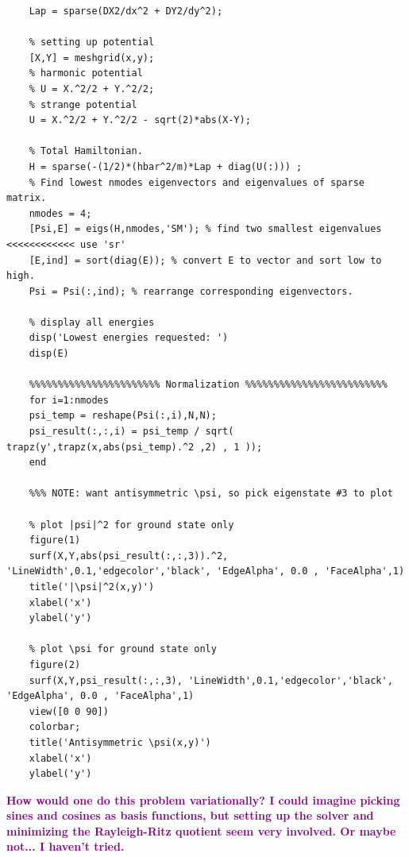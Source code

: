 \documentclass{article}
\theoremstyle{definition}
\begin{document}
\begin{enumerate}[label=(\alph*)]
\begin{lstlisting}
	Lap = sparse(DX2/dx^2 + DY2/dy^2);
	
	% setting up potential
	[X,Y] = meshgrid(x,y);
	% harmonic potential 
	% U = X.^2/2 + Y.^2/2;
	% strange potential
	U = X.^2/2 + Y.^2/2 - sqrt(2)*abs(X-Y);
	
	% Total Hamiltonian.
	H = sparse(-(1/2)*(hbar^2/m)*Lap + diag(U(:))) ; 
	% Find lowest nmodes eigenvectors and eigenvalues of sparse matrix.
	nmodes = 4; 
	[Psi,E] = eigs(H,nmodes,'SM'); % find two smallest eigenvalues <<<<<<<<<<<< use 'sr'
	[E,ind] = sort(diag(E)); % convert E to vector and sort low to high.
	Psi = Psi(:,ind); % rearrange corresponding eigenvectors.

	% display all energies
	disp('Lowest energies requested: ')
	disp(E)
	
	%%%%%%%%%%%%%%%%%%%%%%% Normalization %%%%%%%%%%%%%%%%%%%%%%%%%
	for i=1:nmodes
	psi_temp = reshape(Psi(:,i),N,N);
	psi_result(:,:,i) = psi_temp / sqrt( trapz(y',trapz(x,abs(psi_temp).^2 ,2) , 1 ));  
	end
	
	%%% NOTE: want antisymmetric \psi, so pick eigenstate #3 to plot 
	
	% plot |psi|^2 for ground state only
	figure(1)
	surf(X,Y,abs(psi_result(:,:,3)).^2, 'LineWidth',0.1,'edgecolor','black', 'EdgeAlpha', 0.0 , 'FaceAlpha',1)
	title('|\psi|^2(x,y)')
	xlabel('x')
	ylabel('y')
	
	% plot \psi for ground state only
	figure(2)
	surf(X,Y,psi_result(:,:,3), 'LineWidth',0.1,'edgecolor','black', 'EdgeAlpha', 0.0 , 'FaceAlpha',1)
	view([0 0 90])
	colorbar;
	title('Antisymmetric \psi(x,y)')
	xlabel('x')
	ylabel('y')
	\end{lstlisting}
	
	\textbf{\textcolor{purple}{How would one do this problem variationally? I could imagine picking sines and cosines as basis functions, but setting up the solver and minimizing the Rayleigh-Ritz quotient seem very involved. Or maybe not... I haven't tried.}}
	

\end{enumerate}
\end{document}
